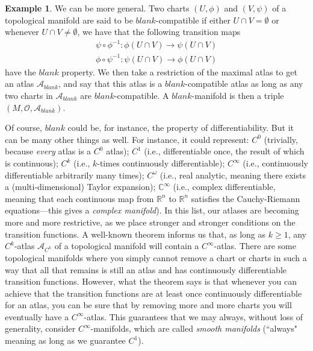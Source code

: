 \documentclass[11pt]{book}
\theoremstyle{definition}
\newtheorem{example}{Example}[section]
\theoremstyle{definition}
\theoremstyle{definition}
\theoremstyle{theorem}
\theoremstyle{definition}
\begin{document}
\begin{example}
	We can be more general. Two charts $(U, \phi)$ and $(V, \psi)$ of a topological manifold are said to be $blank$-compatible if either $U \cap V = \emptyset$ or whenever $U \cap V \neq \emptyset$, we have that the following transition maps 
	\begin{align*}
	\psi \circ \phi^{-1}: \phi(U \cap V) \rightarrow \psi(U \cap V) \\ 
	\phi \circ \psi^{-1}: \psi(U \cap V) \rightarrow \phi(U \cap V) 
	\end{align*} 
	have the $blank$ property. We then take a restriction of the maximal atlas to get an atlas $\mathscr{A}_{blank}$, and say that this atlas is a $blank$-compatible atlas as long as any two charts in $\mathscr{A}_{blank}$ are $blank$-compatible. A $blank$-manifold is then a triple $(M, \mathscr{O}, \mathscr{A}_{blank})$.\par 
	Of course, $blank$ could be, for instance, the property of differentiability. But it can be many other things as well. For instance, it could represent: $C^0$ (trivially, because \textit{every} atlas is a $C^0$ atlas); $C^1$ (i.e., differentiable once, the result of which is continuous); $C^k$ (i.e., $k$-times continuously differentiable); $C^{\infty}$ (i.e., continuously differentiable arbitrarily many times); $C^{\omega}$ (i.e., real analytic, meaning there exists a (multi-dimensional) Taylor expansion); $\mathbb{C}^{\infty}$ (i.e., complex differentiable, meaning that each continuous map from $\mathbb{R}^n$ to $\mathbb{R}^n$ satisfies the Cauchy-Riemann equations---this gives a \textit{complex manifold}). In this list, our atlases are becoming more and more restrictive, as we place stronger and stronger conditions on the transition functions. A well-known theorem informs us that, as long as $k \geq 1$, any $C^k$-atlas $\mathscr{A}_{C^{k}}$ of a topological manifold will contain a $C^{\infty}$-atlas. There are some topological manifolds where you simply cannot remove a chart or charts in such a way that all that remains is still an atlas and has continuously differentiable transition functions. However, what the theorem says is that whenever you can achieve that the transition functions are at least once continuously differentiable for an atlas, you can be sure that by removing more and more charts you will eventually have a $C^{\infty}$-atlas. This guarantees that we may always, without loss of generality, consider $C^{\infty}$-manifolds, which are called \textit{smooth manifolds} (``always" meaning as long as we guarantee $C^1$).\par 

\end{example}
\end{document}
